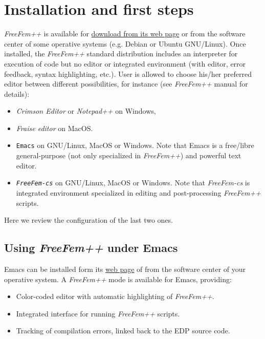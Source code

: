 \documentclass[12pt]{article}
\newcommand{\FF}{\textit{FreeFem++}\xspace}
\newcommand{\FFcs}{\textit{FreeFem-cs}\xspace}
\begin{document}
\section{Installation and first steps}
\label{sec:inst-first-steps}

\FF is available for \href{http://www.freefem.org/}{download from its
  web page} or from the software center of some operative systems
(e.g. Debian or Ubuntu GNU/Linux).  Once installed, the \FF standard
distribution includes an interpreter for execution of code but no
editor or integrated environment (with editor, error feedback, syntax
highlighting, etc.). User is allowed to choose his/her
preferred editor between different possibilities, for instance (see
\FF manual for details):

\begin{itemize}
\item \textit{Crimson Editor} or \textit{Notepad++} on Windows,
\item \textit{Fraise editor} on MacOS.
\item \texttt{Emacs} on GNU/Linux, MacOS or Windows. Note that Emacs
  is a free/libre general-purpose (not only specialized in \FF)
  and powerful text editor.
\item \texttt{\FFcs} on GNU/Linux, MacOS or Windows. Note that \FFcs
  is integrated environment specialized in editing and post-processing
  \FF scripts.
\end{itemize}




Here we review the configuration of the last two ones.

\subsection{Using \FF under Emacs}

Emacs can be installed form its
\href{https://www.gnu.org/software/emacs}{web page} of from the
software center of your operative system.
A \FF mode is available for Emacs, providing:
\begin{itemize}
\item Color-coded editor with automatic highlighting of \FF.
\item Integrated interface for running \FF scripts.
\item Tracking of compilation errors, linked back to the EDP source code.
\end{itemize}
\end{document}
